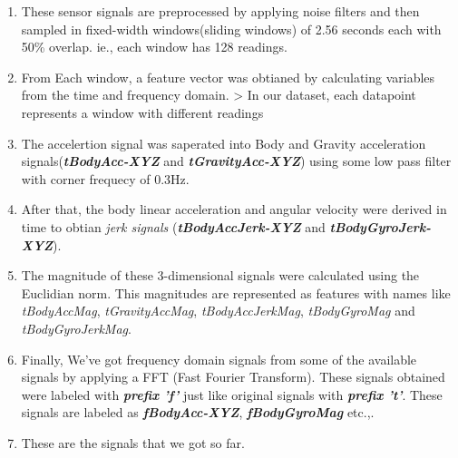 \documentclass[11pt]{article}
\begin{document}
\begin{enumerate}
\def\labelenumi{\arabic{enumi}.}
\item
  These sensor signals are preprocessed by applying noise filters and
  then sampled in fixed-width windows(sliding windows) of 2.56 seconds
  each with 50\% overlap. ie., each window has 128 readings.
\item
  From Each window, a feature vector was obtianed by calculating
  variables from the time and frequency domain. \textgreater{} In our
  dataset, each datapoint represents a window with different readings
\item
  The accelertion signal was saperated into Body and Gravity
  acceleration signals(\textbf{\emph{tBodyAcc-XYZ}} and
  \textbf{\emph{tGravityAcc-XYZ}}) using some low pass filter with
  corner frequecy of 0.3Hz.
\item
  After that, the body linear acceleration and angular velocity were
  derived in time to obtian \emph{jerk signals}
  (\textbf{\emph{tBodyAccJerk-XYZ}} and
  \textbf{\emph{tBodyGyroJerk-XYZ}}).
\item
  The magnitude of these 3-dimensional signals were calculated using the
  Euclidian norm. This magnitudes are represented as features with names
  like \emph{tBodyAccMag}, \emph{tGravityAccMag},
  \emph{tBodyAccJerkMag}, \emph{tBodyGyroMag} and
  \emph{tBodyGyroJerkMag}.
\item
  Finally, We've got frequency domain signals from some of the available
  signals by applying a FFT (Fast Fourier Transform). These signals
  obtained were labeled with \textbf{\emph{prefix 'f'}} just like
  original signals with \textbf{\emph{prefix 't'}}. These signals are
  labeled as \textbf{\emph{fBodyAcc-XYZ}}, \textbf{\emph{fBodyGyroMag}}
  etc.,.
\item
  These are the signals that we got so far.


\end{enumerate}
\end{document}

